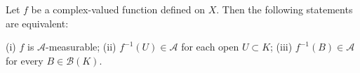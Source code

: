 Let $f$ be a complex-valued function defined on $X$. Then the following statements are equivalent:

(i) $f$ is $\mathcal{A}$-measurable;
(ii) $f^{-1}(U) \in \mathcal{A}$ for each open $U \subset K$;
(iii) $f^{-1}(B) \in \mathcal{A}$ for every $B \in \mathcal{B}(K)$.